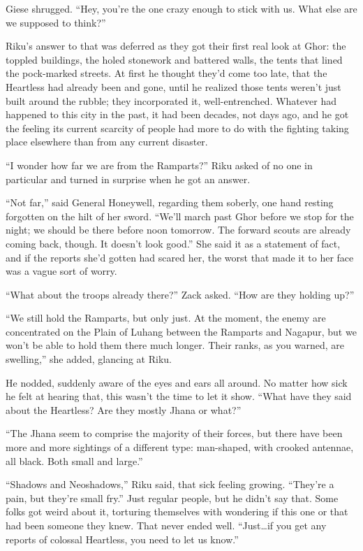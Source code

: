 Giese shrugged. ``Hey, you're the one crazy enough to stick with us. What else are we supposed to think?''

Riku's answer to that was deferred as they got their first real look at Ghor: the toppled buildings, the holed stonework and battered walls, the tents that lined the pock-marked streets. At first he thought they'd come too late, that the Heartless had already been and gone, until he realized those tents weren't just built around the rubble; they incorporated it, well-entrenched. Whatever had happened to this city in the past, it had been decades, not days ago, and he got the feeling its current scarcity of people had more to do with the fighting taking place elsewhere than from any current disaster.

``I wonder how far we are from the Ramparts?'' Riku asked of no one in particular and turned in surprise when he got an answer.

``Not far,'' said General Honeywell, regarding them soberly, one hand resting forgotten on the hilt of her sword. ``We'll march past Ghor before we stop for the night; we should be there before noon tomorrow. The forward scouts are already coming back, though. It doesn't look good.'' She said it as a statement of fact, and if the reports she'd gotten had scared her, the worst that made it to her face was a vague sort of worry.

``What about the troops already there?'' Zack asked. ``How are they holding up?''

``We still hold the Ramparts, but only just. At the moment, the enemy are concentrated on the Plain of Luhang between the Ramparts and Nagapur, but we won't be able to hold them there much longer. Their ranks, as you warned, are swelling,'' she added, glancing at Riku.

He nodded, suddenly aware of the eyes and ears all around. No matter how sick he felt at hearing that, this wasn't the time to let it show. ``What have they said about the Heartless? Are they mostly Jhana or what?''

``The Jhana seem to comprise the majority of their forces, but there have been more and more sightings of a different type: man-shaped, with crooked antennae, all black. Both small and large.''

``Shadows and Neoshadows,'' Riku said, that sick feeling growing. ``They're a pain, but they're small fry.'' Just regular people, but he didn't say that. Some folks got weird about it, torturing themselves with wondering if this one or that had been someone they knew. That never ended well. ``Just\ldots if you get any reports of colossal Heartless, you need to let us know.''

